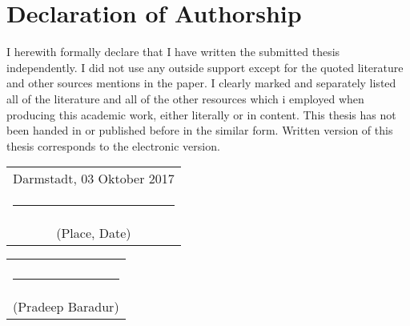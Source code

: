 \chapter*{Declaration of Authorship}

I herewith formally declare that I have written the submitted thesis independently. I did not use any outside support except for the quoted literature and other sources mentions in the paper. I clearly marked and separately listed all of the literature and all of the other resources which i employed when producing this academic work, either literally or in content. This thesis has not been handed in or published before in the similar form. Written version of this thesis corresponds to the electronic version.

\vspace*{3cm}
\noindent
\begin{tabular}{c} Darmstadt, 03 Oktober 2017\\\rule{5cm}{1pt} \\ (Place, Date)\end{tabular}  \hfill \begin{tabular}{c} \\ \\ \rule{5cm}{1pt} \\ (Pradeep Baradur)\end{tabular}
